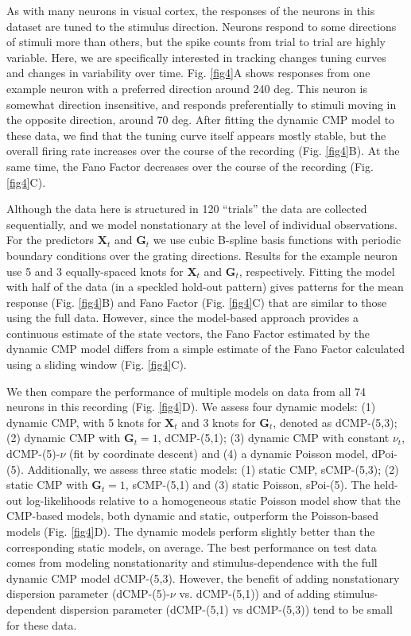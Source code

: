 \documentclass[aoas]{imsart}
\theoremstyle{plain}
\theoremstyle{remark}
\begin{document}
As with many neurons in visual cortex, the responses of the neurons in this dataset are tuned to the stimulus direction. Neurons respond to some directions of stimuli more than others, but the spike counts from trial to trial are highly variable. Here, we are specifically interested in tracking changes tuning curves and changes in variability over time. Fig. \ref{fig4}A shows responses from one example neuron with a preferred direction around 240 deg. This neuron is somewhat direction insensitive, and responds preferentially to stimuli moving in the opposite direction, around 70 deg. After fitting the dynamic CMP model to these data, we find that the tuning curve itself appears mostly stable, but the overall firing rate increases over the course of the recording (Fig. \ref{fig4}B). At the same time, the Fano Factor decreases over the course of the recording (Fig. \ref{fig4}C). 

Although the data here is structured in 120 “trials” the data are collected sequentially, and we model nonstationary at the level of individual observations. For the predictors $\bm{X}_t$ and $\bm{G}_t$ we use cubic B-spline basis functions with periodic boundary conditions over the grating directions. Results for the example neuron use 5 and 3 equally-spaced knots for $\bm{X}_t$ and $\bm{G}_t$, respectively. Fitting the model with half of the data (in a speckled hold-out pattern) gives patterns for the mean response (Fig. \ref{fig4}B) and Fano Factor (Fig. \ref{fig4}C) that are similar to those using the full data. However, since the model-based approach provides a continuous estimate of the state vectors, the Fano Factor estimated by the dynamic CMP model differs from a simple estimate of the Fano Factor calculated using a sliding window (Fig. \ref{fig4}C).

We then compare the performance of multiple models on data from all 74 neurons in this recording (Fig. \ref{fig4}D). We assess four dynamic models: (1) dynamic CMP, with 5 knots for $\bm{X}_t$ and 3 knots for $\bm{G}_t$, denoted as dCMP-(5,3); (2) dynamic CMP with $\bm{G}_t=1$, dCMP-(5,1); (3) dynamic CMP with constant $\nu_t$, dCMP-(5)-$\nu$ (fit by coordinate descent) and (4) a dynamic Poisson model, dPoi-(5). Additionally, we assess three static models: (1) static CMP, sCMP-(5,3); (2) static CMP with $\bm{G}_t=1$, sCMP-(5,1) and (3) static Poisson, sPoi-(5). The held-out log-likelihoods relative to a homogeneous static Poisson model show that the CMP-based models, both dynamic and static, outperform the Poisson-based models (Fig. \ref{fig4}D). The dynamic models perform slightly better than the corresponding static models, on average. The best performance on test data comes from modeling nonstationarity and stimulus-dependence with the full dynamic CMP model dCMP-(5,3). However, the benefit of adding nonstationary dispersion parameter (dCMP-(5)-$\nu$ vs. dCMP-(5,1)) and of adding stimulus-dependent dispersion parameter (dCMP-(5,1) vs dCMP-(5,3)) tend to be small for these data.
\end{document}
